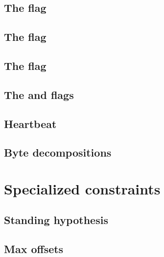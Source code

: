 \subsection{The \roob{} flag}                                                                            \label{mxp: roob}
\subsection{The \noop{} flag}                                                                            \label{mxp: noop}
\subsection{The \mayTriggerNonTrivialOperation{} flag}                                                 \label{mxp: may trigger non trivial operation}
\subsection{The \sizeOneNonzeroNoMxpx{} and \sizeTwoNonzeroNoMxpx{} flags}                  \label{mxp: size nonzero no mxpx}
\subsection{Heartbeat}                                                                              \label{mxp: heartbeat}
\subsection{Byte decompositions}                                                                      \label{mxp: byte decompositions}
                                                                                                                            
\section{Specialized constraints}                                                                                    \label{mxp: specialized constraints}
\subsection{Standing hypothesis}                                                                 
\subsection{Max offsets}                                                                          
